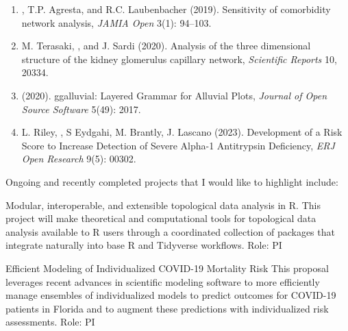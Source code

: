 \documentclass{nihbiosketch}
\begin{document}
\begin{statement}
\begin{enumerate}

\item {}, T.P. Agresta, and R.C. Laubenbacher (2019). Sensitivity of comorbidity network analysis, \emph{JAMIA Open} 3(1): 94--103.
\item M. Terasaki, , and J. Sardi (2020). Analysis of the three dimensional structure of the kidney glomerulus capillary network, \emph{Scientific Reports} 10, 20334.
\item {} (2020). ggalluvial: Layered Grammar for Alluvial Plots, \emph{Journal of Open Source Software} 5(49): 2017.
\item L. Riley, , S Eydgahi, M. Brantly, J. Lascano (2023). Development of a Risk Score to Increase Detection of Severe Alpha-1 Antitrypsin Deficiency, \emph{ERJ Open Research} 9(5): 00302.

\end{enumerate}

\noindent
Ongoing and recently completed projects that I would like to highlight include:

{Modular, interoperable, and extensible topological data analysis in R.}
{This project will make theoretical and computational tools for topological data analysis available to R users through a coordinated collection of packages that integrate naturally into base R and Tidyverse workflows.}
{Role: PI}

{Efficient Modeling of Individualized COVID-19 Mortality Risk}
{This proposal leverages recent advances in scientific modeling software to more efficiently manage ensembles of individualized models to predict outcomes for COVID-19 patients in Florida and to augment these predictions with individualized risk assessments.}
{Role: PI}

\end{statement}
\end{document}
